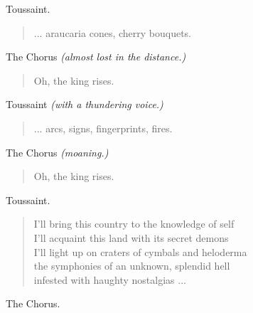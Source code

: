 \documentclass[letterpaper,article,12pt,oneside,notitlepage]{memoir}
\begin{document}
\begin{center}Toussaint.\end{center}

\begin{verse}
... araucaria cones, cherry bouquets. \\
\end{verse}


\begin{center}The Chorus \textit{(almost lost in the distance.)}\end{center}

\begin{verse}
Oh, the king rises. \\
\end{verse}

\begin{center}Toussaint \textit{(with a thundering voice.)}\end{center}

\begin{verse}
... arcs, signs, fingerprints, fires. \\
\end{verse}

\begin{center}The Chorus \textit{(moaning.)}\end{center}

\begin{verse}
Oh, the king rises. \\
\end{verse}

\clearpage

\begin{center}Toussaint.\end{center}

\begin{verse}
\hspace{1cm} I'll bring this country to the knowledge of self \\
I'll acquaint this land with its secret demons \\
I'll light up on craters of cymbals and heloderma \\
the symphonies of an unknown, splendid hell \\
infested with haughty nostalgias ... \\
\end{verse}

\begin{center}The Chorus.\end{center}
\end{document}
